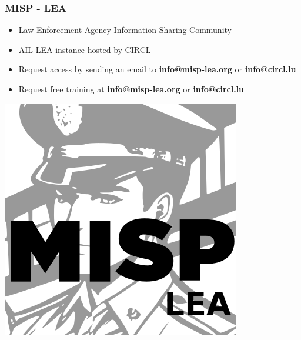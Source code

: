 \documentclass{beamer}
\begin{document}
\begin{frame}
    \frametitle{\textbf{MISP - LEA}}
    \begin{itemize}
        \item Law Enforcement Agency Information Sharing Community
        \item AIL-LEA instance hosted by CIRCL
        \item Request access by sending an email to \textbf{info@misp-lea.org} or \textbf{info@circl.lu}
        \item Request free training at \textbf{info@misp-lea.org} or \textbf{info@circl.lu}
    \end{itemize}
    \begin{center}
        \includegraphics[scale=0.3]{images/misp-lea.png}
    \end{center}
\end{frame}
\end{document}
